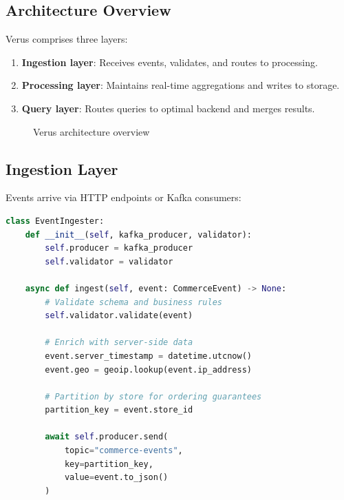 \documentclass[11pt,twocolumn]{article}
\begin{document}
\subsection{Architecture Overview}

Verus comprises three layers:

\begin{enumerate}
\item \textbf{Ingestion layer}: Receives events, validates, and routes to processing.
\item \textbf{Processing layer}: Maintains real-time aggregations and writes to storage.
\item \textbf{Query layer}: Routes queries to optimal backend and merges results.
\end{enumerate}

\begin{figure}[h]
\centering
{}
\caption{Verus architecture overview}
\label{fig:arch}
\end{figure}

\subsection{Ingestion Layer}

Events arrive via HTTP endpoints or Kafka consumers:

\begin{lstlisting}[language=Python,caption=Event ingestion]
class EventIngester:
    def __init__(self, kafka_producer, validator):
        self.producer = kafka_producer
        self.validator = validator

    async def ingest(self, event: CommerceEvent) -> None:
        # Validate schema and business rules
        self.validator.validate(event)

        # Enrich with server-side data
        event.server_timestamp = datetime.utcnow()
        event.geo = geoip.lookup(event.ip_address)

        # Partition by store for ordering guarantees
        partition_key = event.store_id

        await self.producer.send(
            topic="commerce-events",
            key=partition_key,
            value=event.to_json()
        )
\end{lstlisting}
\end{document}
